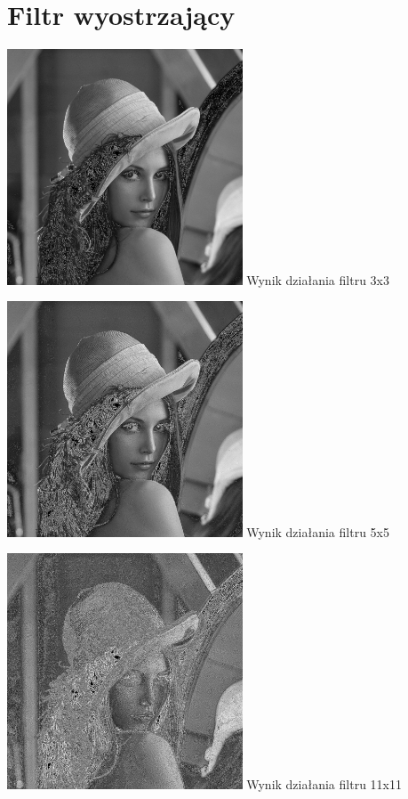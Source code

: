 \documentclass[a4paper,12pt,openany]{report}
\begin{document}
\pagebreak
\section{Filtr wyostrzający}

\begin{center}
\includegraphics[width=7cm]{resources/modified/lena/lena_sharpen_3x3.jpg}
\linebreak
\tiny{Wynik działania filtru 3x3}
\end{center}

\begin{center}
\includegraphics[width=7cm]{resources/modified/lena/lena_sharpen_5x5.jpg}
\linebreak
\tiny{Wynik działania filtru 5x5}
\end{center}

\begin{center}
\includegraphics[width=7cm]{resources/modified/lena/lena_sharpen_11x11.jpg}
\linebreak
\tiny{Wynik działania filtru 11x11}
\end{center}
\end{document}
